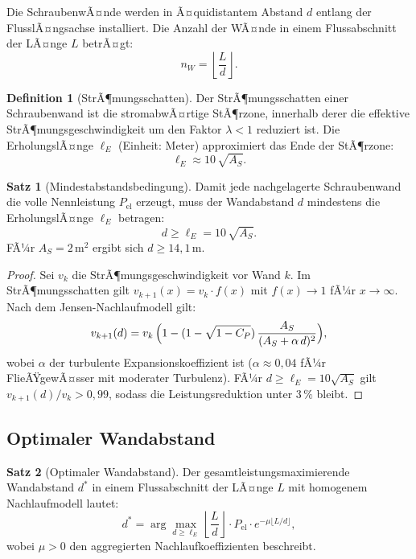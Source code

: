 ﻿\documentclass[a4paper,12pt]{article}
\theoremstyle{definition}
\newtheorem{definition}{Definition}
\newtheorem{satz}{Satz}
\begin{document}
Die SchraubenwÃ¤nde werden in Ã¤quidistantem Abstand $d$ entlang der FlusslÃ¤ngsachse
installiert. Die Anzahl der WÃ¤nde in einem Flussabschnitt der LÃ¤nge $L$ betrÃ¤gt:
\[
  n_W = \left\lfloor \frac{L}{d} \right\rfloor.
\]

\begin{definition}[StrÃ¶mungsschatten]
Der StrÃ¶mungsschatten einer Schraubenwand ist die stromabwÃ¤rtige StÃ¶rzone, innerhalb
derer die effektive StrÃ¶mungsgeschwindigkeit um den Faktor $\lambda < 1$ reduziert ist.
Die ErholungslÃ¤nge $\ell_E$ (Einheit: Meter) approximiert das Ende der StÃ¶rzone:
\[
  \ell_E \approx 10\,\sqrt{A_S}.
\]
\end{definition}

\begin{satz}[Mindestabstandsbedingung]
\label{satz:abstand}
Damit jede nachgelagerte Schraubenwand die volle Nennleistung $P_{\mathrm{el}}$
erzeugt, muss der Wandabstand $d$ mindestens die ErholungslÃ¤nge $\ell_E$ betragen:
\[
  d \geq \ell_E = 10\,\sqrt{A_S}.
\]
FÃ¼r $A_S = 2\,\mathrm{m^2}$ ergibt sich $d \geq 14{,}1\,\mathrm{m}$.
\end{satz}

\begin{proof}
Sei $v_k$ die StrÃ¶mungsgeschwindigkeit vor Wand $k$. Im StrÃ¶mungsschatten gilt
$v_{k+1}(x) = v_k \cdot f(x)$ mit $f(x) \to 1$ fÃ¼r $x \to \infty$.
Nach dem Jensen-Nachlaufmodell gilt:
\[
  v_{k+1}(d) = v_k\,\Bigl(1 - (1-\sqrt{1-C_P})\,\frac{A_S}{(A_S + \alpha\,d)^2}\Bigr),
\]
wobei $\alpha$ der turbulente Expansionskoeffizient ist ($\alpha \approx 0{,}04$
fÃ¼r FlieÃŸgewÃ¤sser mit moderater Turbulenz). FÃ¼r $d \geq \ell_E = 10\sqrt{A_S}$ gilt
$v_{k+1}(d)/v_k > 0{,}99$, sodass die Leistungsreduktion unter $3\,\%$ bleibt. \qedhere
\end{proof}

\subsection{Optimaler Wandabstand}

\begin{satz}[Optimaler Wandabstand]
\label{satz:optabstand}
Der gesamtleistungsmaximierende Wandabstand $d^*$ in einem Flussabschnitt der LÃ¤nge
$L$ mit homogenem Nachlaufmodell lautet:
\[
  d^* = \arg\max_{d \geq \ell_E} \left\lfloor\frac{L}{d}\right\rfloor \cdot
        P_{\mathrm{el}} \cdot e^{-\mu \lfloor L/d \rfloor},
\]
wobei $\mu > 0$ den aggregierten Nachlaufkoeffizienten beschreibt.
\end{satz}
\end{document}
